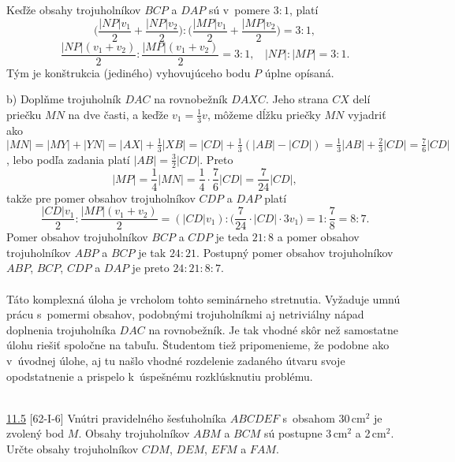 Keďže obsahy trojuholníkov $BCP$ a $DAP$ sú v~pomere $3 : 1$, platí
$$ \bigg(\frac{|NP|v_1}{2}+\frac{|NP|v_2}{2}\bigg): \bigg(\frac{|MP|v_1}{2}+\frac{|MP|v_2}{2}\bigg)= 3 : 1,$$
$$ \frac{|NP|(v_1 + v_2 )}{2}: \frac{|MP|(v_1 + v_2 )}{2}= 3 : 1, \ \ \ \  |NP| : |MP| = 3 : 1.$$
Tým je konštrukcia (jediného) vyhovujúceho bodu $P$ úplne opísaná.

b) Doplňme trojuholník $DAC$ na rovnobežník $DAXC$. Jeho strana $CX$ delí priečku $MN$ na dve časti, a keďže $v_1 =\frac{1}{3}v$, môžeme dĺžku priečky $MN$ vyjadriť ako $|MN| = |MY | + |Y N| = |AX| +\frac{1}{3} |XB| = |CD| +\frac{1}{3} (|AB| - |CD|) = \frac{1}{3}|AB| +\frac{2}{3}|CD| = \frac{7}{6}|CD|$, lebo podľa zadania platí $|AB| =\frac{3}{2}|CD|$. Preto
$$|MP| =\frac{1}{4}|MN| =\frac{1}{4} \cdot \frac{7}{6}|CD| = \frac{7}{24}|CD|,$$
takže pre pomer obsahov trojuholníkov $CDP$ a $DAP$ platí
$$ \frac{|CD|v_1}{2}:\frac{|MP|(v_1 + v_2 )}{2}= (|CD|v_1 ) : \bigg( \frac{7}{24}\cdot |CD| \cdot 3v_1\bigg)= 1 :\frac{7}{8} = 8 : 7.$$
Pomer obsahov trojuholníkov $BCP$ a $CDP$ je teda $21 : 8$ a pomer obsahov trojuholníkov $ABP$ a $BCP$ je tak $24 : 21$. Postupný pomer obsahov trojuholníkov $ABP$, $BCP$, $CDP$ a $DAP$ je preto $24 : 21 : 8 : 7$.\\
\\
\kom Táto komplexná úloha je vrcholom tohto seminárneho stretnutia. Vyžaduje umnú prácu s~pomermi obsahov, podobnými trojuholníkmi aj netriviálny nápad doplnenia trojuholníka $DAC$ na rovnobežník. Je tak vhodné skôr než samostatne úlohu riešiť spoločne na tabuľu. Študentom tiež pripomenieme, že podobne ako v~úvodnej úlohe, aj tu našlo vhodné rozdelenie zadaného útvaru svoje opodstatnenie a prispelo k~úspešnému rozklúsknutiu problému. \\
\\
\begin{tcolorbox}[breakable,notitle,boxrule=0pt,colback=light-gray,colframe=light-gray]\ul{11.5} [62-I-6] Vnútri pravidelného šesťuholníka $ABCDEF$ s~obsahom 30\,cm$^2$ je zvolený bod $M$. Obsahy trojuholníkov $ABM$ a $BCM$ sú postupne 3\,cm$^2$ a 2\,cm$^2$. Určte obsahy trojuholníkov $CDM$, $DEM$, $EFM$ a $FAM$.

\end{tcolorbox}

